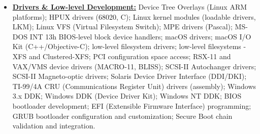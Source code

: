 \documentclass[letterpaper,11pt]{article}
\begin{document}
{\begin{itemize}[leftmargin=0.1in, label={}, itemsep=0pt, parsep=0pt, topsep=0pt, partopsep=0pt]
\item
    \textbf{\underline{Drivers \& Low-level Development:}} \hspace{0pt}
    Device Tree Overlays (Linux ARM platforms);
    HPUX drivers (68020, C);
    Linux kernel modules (loadable drivers, LKM);
    Linux VFS (Virtual Filesystem Switch);
    MPE drivers (Pascal);
    MS-DOS INT 13h BIOS-level block device handlers;
    macOS drivers;
    macOS I/O Kit (C++/Objective-C);
    low-level filesystem drivers;
    low-level filesystems - XFS and Clustered-XFS;
    PCI configuration space access;
    RSX-11 and VAX/VMS device drivers (MACRO-11, BLISS);
    SCSI-II Autochanger drivers;
    SCSI-II Magneto-optic drivers;
    Solaris Device Driver Interface (DDI/DKI);
    TI-99/4A CRU (Communications Register Unit) drivers (assembly);
    Windows 3.x DDK;
    Windows DDK (Device Driver Kit);
    Windows NT DDK;
    BIOS bootloader development;
    EFI (Extensible Firmware Interface) programming;
    GRUB bootloader configuration and customization;
    Secure Boot chain validation and integration.


\end{itemize}}
\end{document}
